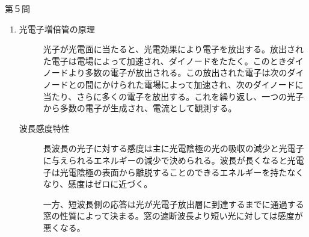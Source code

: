 \documentclass[fleqn]{jbook}
\begin{document}
\begin{answer}{第５問}{}
\begin{enumerate}
\item
\begin{description}
\item[光電子増倍管の原理]
光子が光電面に当たると、光電効果により電子を放出する。放出された電子は電場によって加速され、ダイノードをたたく。このときダイノードより多数の電子が放出される。この放出された電子は次のダイノードとの間にかけられた電場によって加速され、次のダイノードに当たり、さらに多くの電子を放出する。これを繰り返し、一つの光子から多数の電子が生成され、電流として観測する。

\item[波長感度特性]
長波長の光子に対する感度は主に光電陰極の光の吸収の減少と光電子に与えられるエネルギーの減少で決められる。波長が長くなると光電子は光電陰極の表面から離脱することのできるエネルギーを持たなくなり、感度はゼロに近づく。

一方、短波長側の応答は光が光電子放出層に到達するまでに通過する窓の性質によって決まる。窓の遮断波長より短い光に対しては感度が悪くなる。
\end{description}

\end{enumerate}
\end{answer}
\end{document}
